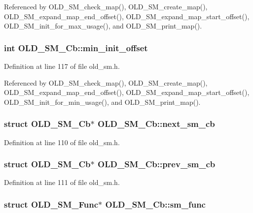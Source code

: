 Referenced by OLD\_\-SM\_\-check\_\-map(), OLD\_\-SM\_\-create\_\-map(), OLD\_\-SM\_\-expand\_\-map\_\-end\_\-offset(), OLD\_\-SM\_\-expand\_\-map\_\-start\_\-offset(), OLD\_\-SM\_\-init\_\-for\_\-max\_\-usage(), and OLD\_\-SM\_\-print\_\-map().
\subsubsection{\setlength{\rightskip}{0pt plus 5cm}int \bf{OLD\_\-SM\_\-Cb::min\_\-init\_\-offset}}\label{structOLD__SM__Cb_2628b42750a8da1b4ce456c87026a4b9}




Definition at line 117 of file old\_\-sm.h.

Referenced by OLD\_\-SM\_\-check\_\-map(), OLD\_\-SM\_\-create\_\-map(), OLD\_\-SM\_\-expand\_\-map\_\-end\_\-offset(), OLD\_\-SM\_\-expand\_\-map\_\-start\_\-offset(), OLD\_\-SM\_\-init\_\-for\_\-min\_\-usage(), and OLD\_\-SM\_\-print\_\-map().
\subsubsection{\setlength{\rightskip}{0pt plus 5cm}struct \bf{OLD\_\-SM\_\-Cb}$\ast$ \bf{OLD\_\-SM\_\-Cb::next\_\-sm\_\-cb}}\label{structOLD__SM__Cb_f98bb5e99b4c7528c4f14b1642523d88}




Definition at line 110 of file old\_\-sm.h.
\subsubsection{\setlength{\rightskip}{0pt plus 5cm}struct \bf{OLD\_\-SM\_\-Cb}$\ast$ \bf{OLD\_\-SM\_\-Cb::prev\_\-sm\_\-cb}}\label{structOLD__SM__Cb_df6e6cb36cf459ce9fa0ebe70cf4f43b}




Definition at line 111 of file old\_\-sm.h.
\subsubsection{\setlength{\rightskip}{0pt plus 5cm}struct \bf{OLD\_\-SM\_\-Func}$\ast$ \bf{OLD\_\-SM\_\-Cb::sm\_\-func}}\label{structOLD__SM__Cb_4570cf205a971bfab2323c3c65aaaea4}




